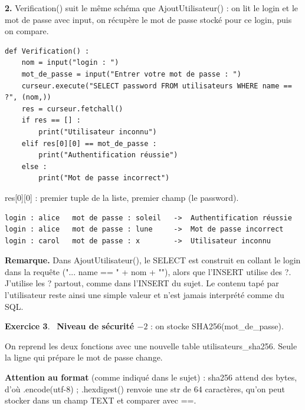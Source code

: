 \documentclass[11pt,a4paper]{article}
\newcommand{\code}[1]{\colorbox{fondcode}{\ttfamily\small #1}}
\newcommand{\q}{\textquotesingle}
\newcommand{\exo}[1]{\par\medskip\textbf{Exercice #1}.\ }
\begin{document}
\textbf{2.} \code{Verification()} suit le même schéma que \code{AjoutUtilisateur()} : on lit le login et le mot de passe avec \code{input}, on récupère le mot de passe stocké pour ce login, puis on compare.

\begin{lstlisting}
def Verification() :
    nom = input("login : ")
    mot_de_passe = input("Entrer votre mot de passe : ")
    curseur.execute("SELECT password FROM utilisateurs WHERE name == ?", (nom,))
    res = curseur.fetchall()
    if res == [] :
        print("Utilisateur inconnu")
    elif res[0][0] == mot_de_passe :
        print("Authentification réussie")
    else :
        print("Mot de passe incorrect")
\end{lstlisting}

\code{res[0][0]} : premier tuple de la liste, premier champ (le \code{password}).

\begin{lstlisting}[style=sortie]
login : alice   mot de passe : soleil   ->  Authentification réussie
login : alice   mot de passe : lune     ->  Mot de passe incorrect
login : carol   mot de passe : x        ->  Utilisateur inconnu
\end{lstlisting}

\textbf{Remarque.} Dans \code{AjoutUtilisateur()}, le \code{SELECT} est construit en collant le login dans la requête (\code{"... name == \q{}" + nom + "\q{}"}), alors que l'\code{INSERT} utilise des \code{?}. J'utilise les \code{?} partout, comme dans l'\code{INSERT} du sujet. Le contenu tapé par l'utilisateur reste ainsi une simple valeur et n'est jamais interprété comme du SQL.

\exo{3} \textbf{Niveau de sécurité $-2$} : on stocke \code{SHA256(mot\_de\_passe)}.

On reprend les deux fonctions avec une nouvelle table \code{utilisateurs\_sha256}. Seule la ligne qui prépare le mot de passe change.

\textbf{Attention au format} (comme indiqué dans le sujet) : \code{sha256} attend des \code{bytes}, d'où \code{.encode(\q{}utf-8\q{})} ; \code{.hexdigest()} renvoie une \code{str} de 64 caractères, qu'on peut stocker dans un champ \code{TEXT} et comparer avec \code{==}.
\end{document}
